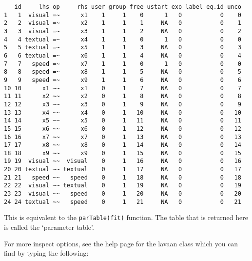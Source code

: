 \begin{verbatim}
   id     lhs op     rhs user group free ustart exo label eq.id unco
1   1  visual =~      x1    1     1    0      1   0           0    0
2   2  visual =~      x2    1     1    1     NA   0           0    1
3   3  visual =~      x3    1     1    2     NA   0           0    2
4   4 textual =~      x4    1     1    0      1   0           0    0
5   5 textual =~      x5    1     1    3     NA   0           0    3
6   6 textual =~      x6    1     1    4     NA   0           0    4
7   7   speed =~      x7    1     1    0      1   0           0    0
8   8   speed =~      x8    1     1    5     NA   0           0    5
9   9   speed =~      x9    1     1    6     NA   0           0    6
10 10      x1 ~~      x1    0     1    7     NA   0           0    7
11 11      x2 ~~      x2    0     1    8     NA   0           0    8
12 12      x3 ~~      x3    0     1    9     NA   0           0    9
13 13      x4 ~~      x4    0     1   10     NA   0           0   10
14 14      x5 ~~      x5    0     1   11     NA   0           0   11
15 15      x6 ~~      x6    0     1   12     NA   0           0   12
16 16      x7 ~~      x7    0     1   13     NA   0           0   13
17 17      x8 ~~      x8    0     1   14     NA   0           0   14
18 18      x9 ~~      x9    0     1   15     NA   0           0   15
19 19  visual ~~  visual    0     1   16     NA   0           0   16
20 20 textual ~~ textual    0     1   17     NA   0           0   17
21 21   speed ~~   speed    0     1   18     NA   0           0   18
22 22  visual ~~ textual    0     1   19     NA   0           0   19
23 23  visual ~~   speed    0     1   20     NA   0           0   20
24 24 textual ~~   speed    0     1   21     NA   0           0   21
\end{verbatim}

This is equivalent to the \texttt{parTable(fit)} function. The table
that is returned here is called the `parameter table'.

For more inspect options, see the help page for the lavaan class which
you can find by typing the following:

\begin{Shaded}
\begin{Highlighting}[]
\end{Highlighting}
\end{Shaded}

